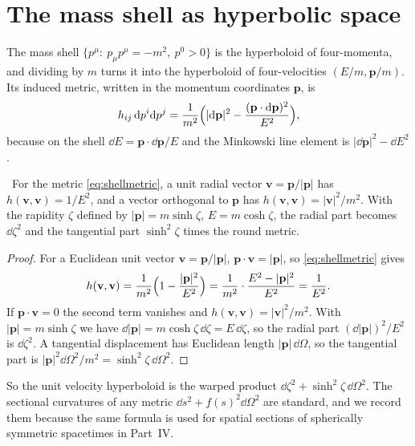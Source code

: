 \section{The mass shell as hyperbolic space}

The mass shell $\{p^\mu:\ p_\mu p^\mu=-m^2,\ p^0>0\}$ is the hyperboloid of four-momenta, and dividing by $m$ turns it into the hyperboloid of four-velocities $(E/m,\mathbf p/m)$. Its induced metric, written in the momentum coordinates $\mathbf p$, is
\begin{equation}\label{eq:shellmetric}
h_{ij}\,\mathrm{d} p^i\mathrm{d} p^j=\frac{1}{m^2}\Bigl(|\mathrm{d}\mathbf p|^2-\frac{(\mathbf p\cdot\mathrm{d}\mathbf p)^2}{E^2}\Bigr),
\end{equation}
because on the shell $\dd E=\mathbf p\cdot\dd\mathbf p/E$ and the Minkowski line element is $|\dd\mathbf p|^2-\dd E^2$.

\begin{proposition}\label{prop:shellmetric}\ver\
For the metric \eqref{eq:shellmetric}, a unit radial vector $\mathbf v=\mathbf p/|\mathbf p|$ has $h(\mathbf v,\mathbf v)=1/E^2$, and a vector orthogonal to $\mathbf p$ has $h(\mathbf v,\mathbf v)=|\mathbf v|^2/m^2$. With the rapidity $\zeta$ defined by $|\mathbf p|=m\sinh\zeta$, $E=m\cosh\zeta$, the radial part becomes $\dd\zeta^2$ and the tangential part $\sinh^2\zeta$ times the round metric.
\end{proposition}
\begin{proof}
For a Euclidean unit vector $\mathbf v=\mathbf p/|\mathbf p|$, $\mathbf p\cdot\mathbf v=|\mathbf p|$, so \eqref{eq:shellmetric} gives
\[
h(\mathbf v,\mathbf v)=\frac1{m^2}\Bigl(1-\frac{|\mathbf p|^2}{E^2}\Bigr)=\frac1{m^2}\cdot\frac{E^2-|\mathbf p|^2}{E^2}=\frac1{E^2}.
\]
If $\mathbf p\cdot\mathbf v=0$ the second term vanishes and $h(\mathbf v,\mathbf v)=|\mathbf v|^2/m^2$. With $|\mathbf p|=m\sinh\zeta$ we have $\dd|\mathbf p|=m\cosh\zeta\,\dd\zeta=E\,\dd\zeta$, so the radial part $(\dd|\mathbf p|)^2/E^2$ is $\dd\zeta^2$. A tangential displacement has Euclidean length $|\mathbf p|\,\dd\Omega$, so the tangential part is $|\mathbf p|^2\dd\Omega^2/m^2=\sinh^2\zeta\,\dd\Omega^2$.
\end{proof}


So the unit velocity hyperboloid is the warped product $\dd\zeta^2+\sinh^2\zeta\,\dd\Omega^2$. The sectional curvatures of any metric $\dd s^2+f(s)^2\dd\Omega^2$ are standard, and we record them because the same formula is used for spatial sections of spherically symmetric spacetimes in Part~IV.

